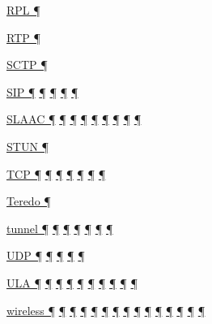 \documentclass[
]{article}
\begin{document}
\hyperref[routing]{RPL ¶}

\hyperref[transport-protocols]{RTP ¶}

\hyperref[transport-protocols]{SCTP ¶}

\hyperref[why-version-6]{SIP ¶} \hyperref[transport-protocols]{¶}
\hyperref[dual-stack-scenarios]{¶}
\hyperref[translation-and-ipv4-as-a-service]{¶}
\hyperref[multihoming]{¶}

\hyperref[auto-configuration]{SLAAC ¶}
\hyperref[managed-configuration]{¶} \hyperref[routing]{¶}
\hyperref[ipv6-primary-differences-from-ipv4]{¶} \hyperref[security]{¶}
\hyperref[filtering]{¶} \hyperref[layer-2-considerations]{¶}
\hyperref[address-and-prefix-management]{¶}
\hyperref[multi-prefix-operation]{¶}

\hyperref[transport-protocols]{STUN ¶}

\hyperref[why-version-6]{TCP ¶} \hyperref[addresses]{¶}
\hyperref[extension-headers-and-options]{¶} \hyperref[packet-format]{¶}
\hyperref[traffic-class-and-flow-label]{¶}
\hyperref[transport-protocols]{¶} \hyperref[multihoming]{¶}

\hyperref[obsolete-techniques]{Teredo ¶}

\hyperref[layer-2-functions]{tunnel ¶}
\hyperref[traffic-class-and-flow-label]{¶}
\hyperref[coexistence-with-legacy-ipv4]{¶}
\hyperref[dual-stack-scenarios]{¶} \hyperref[obsolete-techniques]{¶}
\hyperref[tunnels]{¶} \hyperref[layer-2-considerations]{¶}

\hyperref[extension-headers-and-options]{UDP ¶}
\hyperref[managed-configuration]{¶} \hyperref[packet-format]{¶}
\hyperref[transport-protocols]{¶} \hyperref[obsolete-techniques]{¶}

\hyperref[addresses]{ULA ¶} \hyperref[auto-configuration]{¶}
\hyperref[dns]{¶} \hyperref[source-and-destination-address-selection]{¶}
\hyperref[ipv6-primary-differences-from-ipv4]{¶}
\hyperref[translation-and-ipv4-as-a-service]{¶} \hyperref[filtering]{¶}
\hyperref[topology-obfuscation]{¶} \hyperref[multi-prefix-operation]{¶}
\hyperref[multihoming]{¶}

\hyperref[address-resolution]{wireless ¶}
\hyperref[auto-configuration]{¶} \hyperref[layer-2-functions]{¶}
\hyperref[managed-configuration]{¶} \hyperref[routing]{¶}
\hyperref[ipv6-primary-differences-from-ipv4]{¶}
\hyperref[layer-2-considerations]{¶} \hyperref[network-design]{¶}
\hyperref[address-planning]{¶} \hyperref[prefix-per-host]{¶}
\hyperref[address-and-prefix-management]{¶}
\hyperref[multi-prefix-operation]{¶} \hyperref[multihoming]{¶}
\hyperref[deployment-by-carriers]{¶}
\hyperref[deployment-in-the-home]{¶}
\end{document}
